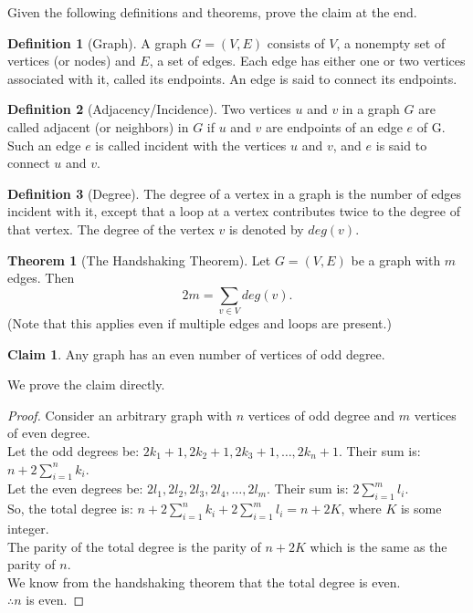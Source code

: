 \documentclass[addpoints]{exam}
\theoremstyle{definition}
\newtheorem{definition}{Definition}[section]
\newtheorem{theorem}{Theorem}
\theoremstyle{claim}
\newtheorem{claim}{Claim}
\begin{document}
\begin{questions}
\question[10] Given the following definitions and theorems, prove the claim at the end.

\begin{definition}[Graph]
  A graph $G = (V, E)$ consists of $V$, a nonempty set of vertices (or nodes) and $E$, a set of edges. Each edge has either one or two vertices associated with it, called its endpoints. An edge is said to connect its endpoints.
\end{definition}

\begin{definition}[Adjacency/Incidence]
  Two vertices $u$ and $v$ in a graph $G$ are called adjacent (or neighbors) in $G$ if $u$ and $v$ are endpoints of an edge $e$ of G. Such an edge $e$ is called incident with the vertices $u$ and $v$, and $e$ is said to connect $u$ and $v$.
\end{definition}

\begin{definition}[Degree]
The degree of a vertex in a graph is the number of edges incident with it, except that a loop at a vertex contributes twice to the degree of that vertex. The degree of the vertex $v$ is denoted by $deg(v)$.
\end{definition}

\begin{theorem}[The Handshaking Theorem]
  Let $G = (V, E)$ be a graph with $m$ edges. Then
  \[
    2m = \sum_{v\in V}deg(v).
  \]
  (Note that this applies even if multiple edges and loops are present.)
\end{theorem}

\begin{claim}
  Any graph has an even number of vertices of odd degree.
\end{claim}
  
\begin{solution}
  We prove the claim directly.
  \begin{proof}
    Consider an arbitrary graph with $n$ vertices of odd degree and $m$ vertices of even degree.\\
    Let the odd degrees be: $2k_1+1, 2k_2+1, 2k_3+1, \ldots, 2k_n+1$. Their sum is: $n + 2\sum_{i=1}^nk_i$.\\
    Let the even degrees be: $2l_1, 2l_2, 2l_3, 2l_4, \ldots, 2l_m$. Their sum is: $2\sum_{i=1}^ml_i$.\\
    So, the total degree is: $n + 2\sum_{i=1}^nk_i + 2\sum_{i=1}^ml_i = n + 2K$, where $K$ is some integer.\\
    The parity of the total degree is the parity of $n + 2K$ which is the same as the parity of $n$.\\
    We know from the handshaking theorem that the total degree is even.\\
    $\therefore n$ is even.
  \end{proof}
\end{solution}
\end{questions}
\end{document}
